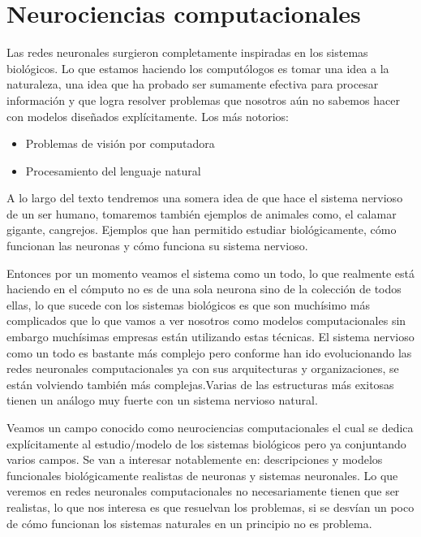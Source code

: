 \section{Neurociencias computacionales}

Las redes neuronales surgieron completamente inspiradas en los sistemas biológicos. 
Lo que estamos haciendo los computólogos es tomar una idea a la naturaleza, una idea que ha probado ser sumamente efectiva para procesar información y que logra resolver problemas que nosotros aún no sabemos hacer con modelos diseñados explícitamente.
Los más notorios: 
\begin{itemize}
\item Problemas de visión por computadora 
\item Procesamiento del lenguaje natural 
\end{itemize}

A lo largo del texto tendremos una somera idea de que hace el sistema nervioso de un ser humano, tomaremos también ejemplos de animales como, el calamar gigante, cangrejos. Ejemplos que han permitido estudiar biológicamente, cómo funcionan las neuronas y cómo funciona su sistema nervioso. 

Entonces por un momento veamos el sistema como un todo, lo que realmente está haciendo en el cómputo no es de una sola neurona sino de la colección de todos ellas, lo que sucede con los sistemas biológicos es que son muchísimo más complicados que lo que vamos a ver nosotros como modelos computacionales sin embargo muchísimas empresas están utilizando estas técnicas. 
El sistema nervioso como un todo es bastante más complejo pero conforme han ido evolucionando las redes neuronales computacionales ya con sus arquitecturas y organizaciones, se están volviendo también más complejas.Varias de las estructuras más exitosas tienen un análogo muy fuerte con un sistema nervioso natural. 

Veamos un campo conocido como neurociencias computacionales el cual se dedica explícitamente al estudio/modelo de los sistemas biológicos pero ya conjuntando varios campos. Se van a interesar notablemente en:  descripciones y modelos funcionales biológicamente realistas de neuronas y sistemas neuronales. Lo que veremos en redes neuronales computacionales no necesariamente tienen que ser realistas, lo que nos interesa es que resuelvan los problemas, si se desvían un poco de cómo funcionan los sistemas naturales en un principio no es problema. 

